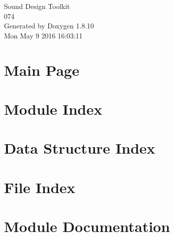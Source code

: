 \documentclass[twoside]{book}
\newcommand{\+}{\discretionary{\mbox{\scriptsize$\hookleftarrow$}}{}{}}
\newcommand{\clearemptydoublepage}{%
  \newpage{\pagestyle{empty}\cleardoublepage}%
}
\begin{document}
\hypersetup{pageanchor=false,
             bookmarks=true,
             bookmarksnumbered=true,
             pdfencoding=unicode
            }
\begin{titlepage}
\vspace*{7cm}
\begin{center}%
{\Large Sound Design Toolkit \\[1ex]\large 074 }\\
\vspace*{1cm}
{\large Generated by Doxygen 1.8.10}\\
\vspace*{0.5cm}
{\small Mon May 9 2016 16:03:11}\\
\end{center}
\end{titlepage}
\clearemptydoublepage
\tableofcontents
\clearemptydoublepage
{}
\hypersetup{pageanchor=true}

\chapter{Main Page}
\label{index}\hypertarget{index}{}
\chapter{Module Index}

\chapter{Data Structure Index}

\chapter{File Index}

\chapter{Module Documentation}









































\end{document}
